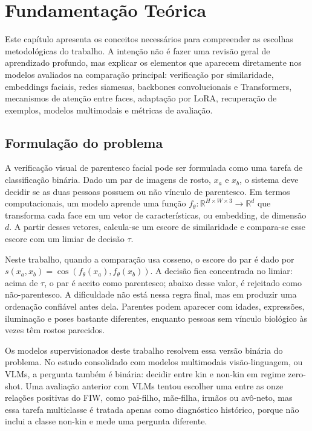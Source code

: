 \chapter[Fundamentação Teórica]{Fundamentação Teórica}
\label{cap:fundamentacao-teorica}

Este capítulo apresenta os conceitos necessários para compreender as escolhas metodológicas do trabalho. A intenção não é fazer uma revisão geral de aprendizado profundo, mas explicar os elementos que aparecem diretamente nos modelos avaliados na comparação principal: verificação por similaridade, embeddings faciais, redes siamesas, backbones convolucionais e Transformers, mecanismos de atenção entre faces, adaptação por LoRA, recuperação de exemplos, modelos multimodais e métricas de avaliação.

\section{Formulação do problema}

A verificação visual de parentesco facial pode ser formulada como uma tarefa de classificação binária. Dado um par de imagens de rosto, $x_a$ e $x_b$, o sistema deve decidir se as duas pessoas possuem ou não vínculo de parentesco. Em termos computacionais, um modelo aprende uma função $f_\theta : \mathbb{R}^{H \times W \times 3} \to \mathbb{R}^d$ que transforma cada face em um vetor de características, ou embedding, de dimensão $d$. A partir desses vetores, calcula-se um escore de similaridade e compara-se esse escore com um limiar de decisão $\tau$.

Neste trabalho, quando a comparação usa cosseno, o escore do par é dado por $s(x_a, x_b) = \cos(f_\theta(x_a), f_\theta(x_b))$. A decisão fica concentrada no limiar: acima de $\tau$, o par é aceito como parentesco; abaixo desse valor, é rejeitado como não-parentesco. A dificuldade não está nessa regra final, mas em produzir uma ordenação confiável antes dela. Parentes podem aparecer com idades, expressões, iluminação e poses bastante diferentes, enquanto pessoas sem vínculo biológico às vezes têm rostos parecidos.

Os modelos supervisionados deste trabalho resolvem essa versão binária do problema. No estudo consolidado com modelos multimodais visão-linguagem, ou VLMs, a pergunta também é binária: decidir entre kin e non-kin em regime zero-shot. Uma avaliação anterior com VLMs tentou escolher uma entre as onze relações positivas do FIW, como pai-filho, mãe-filha, irmãos ou avô-neto, mas essa tarefa multiclasse é tratada apenas como diagnóstico histórico, porque não inclui a classe non-kin e mede uma pergunta diferente.

